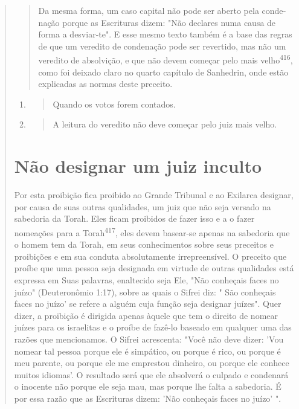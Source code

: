 \begin{quote}
\begin{quote}
Da mesma forma, um caso capital não pode ser aberto pela conde­nação
porque as Escrituras dizem: "Não declares numa causa de forma a
desviar-te". E esse mesmo texto também é a base das regras de que um
veredito de condenação pode ser revertido, mas não um veredito de
absolvição, e que não devem começar pelo mais
velho\textsuperscript{416}, como foi deixado claro no quarto capítu­lo
de Sanhedrin, onde estão explicadas as normas deste preceito.
\end{quote}

\begin{enumerate}
\def\labelenumi{\arabic{enumi}.}
\setcounter{enumi}{414}
\item
 \begin{quote}
 Quando os votos forem contados.
 \end{quote}
\item
 \begin{quote}
 A leitura do veredito não deve começar pelo juiz mais velho.
 \end{quote}
\end{enumerate}


\section{Não designar um juiz inculto}

Por esta proibição fica proibido ao Grande Tribunal e ao Exilarca
designar, por causa de suas outras qualidades, um juiz que não seja
versado na sabedoria da Torah. Eles ficam proibidos de fazer isso e a o
fazer nomeações para a Torah\textsuperscript{417}, eles devem basear-se
apenas na sabedoria que o homem tem da Torah, em seus conhecimentos
sobre seus preceitos e proibições e em sua conduta absolutamente
irrepreensível. O preceito que proíbe que uma pessoa seja designada em
virtude de outras qualidades está expressa em Suas palavras, enaltecido
seja Ele, "Não conheçais faces no juízo" (Deuteronômio 1:17), so­bre as
quais o Sifrei diz: " São conheçais faces no juízo' se refere a alguém
cuja função seja designar juízes". Quer dizer, a proibição é dirigida
apenas àquele que tem o direito de nomear juízes para os israelitas e o
proíbe de fazê-lo basea­do em qualquer uma das razões que mencionamos. O
Sifrei acrescenta: "Você não deve dizer: 'Vou nomear tal pessoa porque
ele é simpático, ou porque é rico, ou porque é meu parente, ou porque
ele me emprestou dinheiro, ou por­que ele conhece muitos idiomas'. O
resultado será que ele absolverá o culpado e condenará o inocente não
porque ele seja mau, mas porque lhe falta a sabe­doria. É por essa razão
que as Escrituras dizem: 'Não conheçais faces no juízo' ".


\end{quote}
